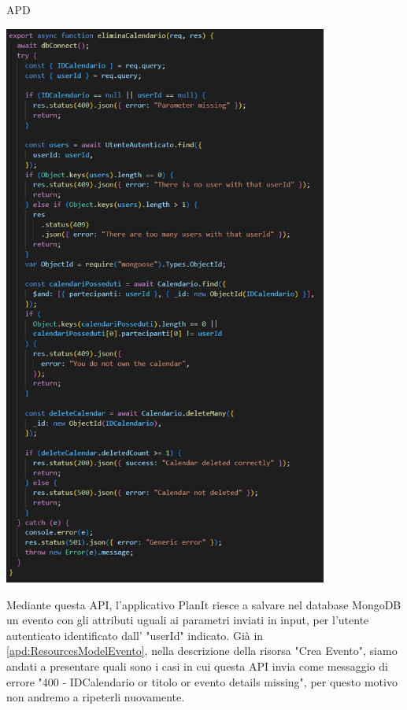 \begin{listaPersonale} {APD}
\begin{listaPersonale2}[APD]{}
                \begin{center}
                    \includegraphics[width=0.8\textwidth, height=0.9\textheight]{img/png/APIs/eliminaCalendario.png}
                \end{center}
                Mediante questa API, l'applicativo PlanIt riesce a salvare nel database MongoDB un evento con gli attributi uguali ai parametri inviati in input, per l'utente autenticato identificato dall' "userId" indicato. Già in \ref{apd:ResourcesModelEvento}, nella descrizione della risorsa "Crea Evento", siamo andati a presentare quali sono i casi in cui questa API invia come messaggio di errore "400 - IDCalendario or titolo or evento details missing", per questo motivo non andremo a ripeterli nuovamente. \\

\end{listaPersonale2}
\end{listaPersonale}
